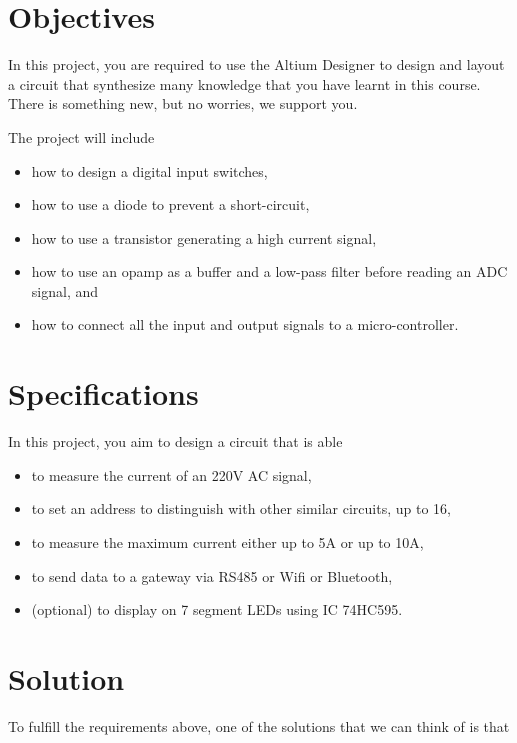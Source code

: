 
\section{Objectives}
In this project, you are required to use the Altium Designer to design and layout a circuit that synthesize many knowledge that you have learnt in this course. There is something new, but no worries, we support you. 

The project will include 
\begin{itemize}
    \item how to design a digital input switches,
    \item how to use a diode to prevent a short-circuit,
    \item how to use a transistor generating a high current signal,
    \item how to use an opamp as a buffer and a low-pass filter before reading an ADC signal, and
    \item how to connect all the input and output signals to a micro-controller.
\end{itemize}

\section{Specifications}
In this project, you aim to design a circuit that is able  
\begin{itemize}
    \item to measure the current of an 220V AC signal,
    \item to set an address to distinguish with other similar circuits, up to 16, 
    \item to measure the maximum current either up to 5A or up to 10A,
    \item to send data to a gateway via RS485 or Wifi or Bluetooth,
    \item  (optional) to display on 7 segment LEDs using IC 74HC595.
\end{itemize}

\section{Solution}
To fulfill the requirements above, one of the solutions that we can think of is that 

